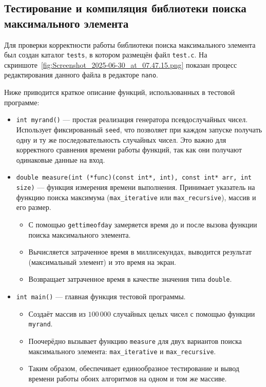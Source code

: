 \subsection{Тестирование и компиляция библиотеки поиска максимального элемента}

Для проверки корректности работы библиотеки поиска максимального элемента был создан каталог \texttt{tests}, в котором размещён файл \texttt{test.c}. 
На скриншоте~\ref{fig:Screenshot_2025-06-30_at_07.47.15.png} показан процесс редактирования данного файла в редакторе \texttt{nano}.


\vspace{0.5cm}
\noindent
Ниже приводится краткое описание функций, использованных в тестовой программе:

\begin{itemize}
  \item \texttt{int myrand()} — простая реализация генератора псевдослучайных чисел. Использует фиксированный \texttt{seed}, что позволяет при каждом запуске получать одну и ту же последовательность случайных чисел. Это важно для корректного сравнения времени работы функций, так как они получают одинаковые данные на вход.

\item \texttt{double measure(int (*func)(const int*, int), const int* arr, int size)} — функция измерения времени выполнения. Принимает указатель на функцию поиска максимума (\texttt{max\_iterative} или \texttt{max\_recursive}), массив и его размер. 
\begin{itemize}
    \item С помощью \texttt{gettimeofday} замеряется время до и после вызова функции поиска максимального элемента.
    \item Вычисляется затраченное время в миллисекундах, выводится результат (максимальный элемент) и это время на экран.
    \item Возвращает затраченное время в качестве значения типа \texttt{double}.
\end{itemize}

\item \texttt{int main()} — главная функция тестовой программы. 
  \begin{itemize}
      \item Создаёт массив из $100\,000$ случайных целых чисел с помощью функции \texttt{myrand}.
      \item Поочерёдно вызывает функцию \texttt{measure} для двух вариантов поиска максимального элемента: \texttt{max\_iterative} и \texttt{max\_recursive}.
      \item Таким образом, обеспечивает единообразное тестирование и вывод времени работы обоих алгоритмов на одном и том же массиве.
  \end{itemize}
\end{itemize}

